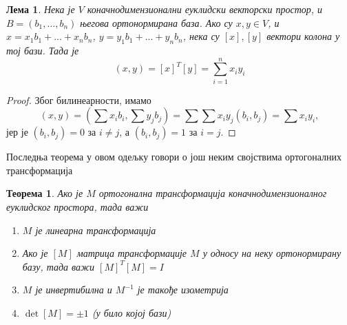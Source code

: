 \documentclass{report}
\theoremstyle{plain}
\newtheorem{thm}{Теорема}
\newtheorem*{lem}{Лема}
\theoremstyle{definition}
\begin{document}
\begin{lem}
  Нека је $V$ коначнодимензионални еуклидски векторски простор, и $B = (b_1, ..., b_n)$ његова ортонормирана база. Ако су $x, y \in V$, и $x = x_1b_1+...+x_nb_n$, $y = y_1b_1+...+y_nb_n$, нека су $[x], [y]$ вектори колона у тој бази. Тада је $$(x, y) = [x]^T [y] = \sum_{i=1}^{n} x_iy_i$$
\end{lem}
\begin{proof}
    Због билинеарности, имамо
    $$(x, y) = (\sum x_ib_i, \sum y_j b_j) = \sum \sum x_iy_j(b_i, b_j) = \sum x_iy_i, $$
    јер је $(b_i, b_j) = 0$ за $i\neq j$, а $(b_i, b_j) = 1$ за $i=j$.
\end{proof}

Последња теорема у овом одељку говори о још неким својствима ортогоналних трансформација
\begin{thm}
Ако је $M$ ортогонална трансформација коначнодимензионалног еуклидског простора, тада важи
\begin{enumerate}
  \item $M$ је линеарна трансформација
  \item Ако је $[M]$ матрица трансформације $M$ у односу на неку ортонормирану базу, тада важи $[M]^T[M] = I$
  \item $M$ је инвертибилна и $M^{-1}$ је такође изометрија
  \item $\det [M]=\pm 1$ (у било којој бази)
\end{enumerate}
\end{thm}
\end{document}
